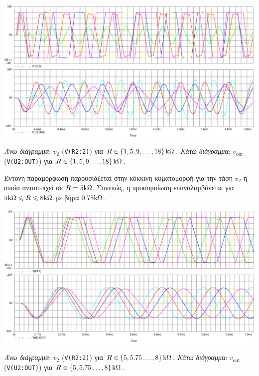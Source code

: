 \begin{chart}[H]
	\begin{center}
		\includegraphics[width=15cm]{spice_01/q5_2.pdf}
		\caption{\textsl{Άνω διάγραμμα}: $v_2$ (\texttt{V(R2:2)}) για $R\in\left\{1,5,9,\ldots,18\right\}\kohm$. \textsl{Κάτω διάγραμμα}: $v_{\mathrm{out}}$ (\texttt{V(U2:OUT)}) για $R\in\left\{1,5,9\ldots,18\right\}\kohm$.}
		\label{plot:ask1:q5_2}
	\end{center}
\end{chart}

Έντονη παραμόρφωση παρουσιάζεται στην κόκκινη κυματομορφή για την τάση $v_2$ η οποία αντιστοιχεί σε $R=5\kohm$. Συνεπώς, η προσομοίωση επαναλαμβάνεται για $5\kohm\leqslant R\leqslant 8\kohm$ με βήμα $0.75\kohm$.

\begin{chart}[H]
	\begin{center}
		\includegraphics[width=15cm]{spice_01/q5_3.pdf}
		\caption{\textsl{Άνω διάγραμμα}: $v_2$ (\texttt{V(R2:2)}) για $R\in\left\{5,5.75\ldots,8\right\}\kohm$. \textsl{Κάτω διάγραμμα}: $v_{\mathrm{out}}$ (\texttt{V(U2:OUT)}) για $R\in\left\{5,5.75\ldots,8\right\}\kohm$.}
		\label{plot:ask1:q5_3}
	\end{center}
\end{chart}

